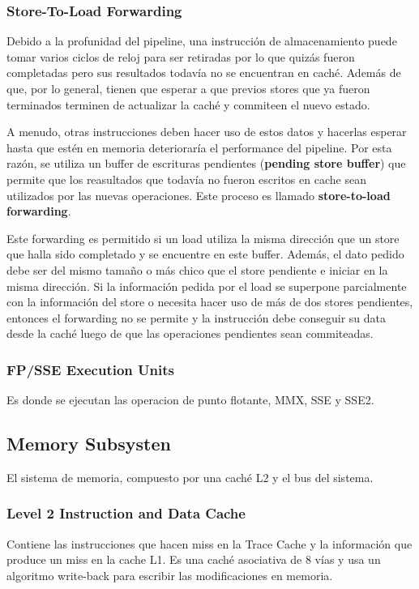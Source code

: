 \subsubsection*{Store-To-Load Forwarding}
Debido a la profunidad del pipeline, una instrucción de almacenamiento puede tomar varios ciclos de reloj para ser retiradas por lo que quizás fueron completadas pero sus resultados todavía no se encuentran en caché. Además de que, por lo general, tienen que esperar a que previos stores que ya fueron terminados terminen de actualizar la caché y commiteen el nuevo estado.
 
A menudo, otras instrucciones deben hacer uso de estos datos y hacerlas esperar hasta que estén en memoria deterioraría el performance del pipeline. Por esta razón, se utiliza un buffer de escrituras pendientes (\textbf{pending store buffer}) que permite que los reasultados que todavía no fueron escritos en cache sean utilizados por las nuevas operaciones. Este proceso es llamado \textbf{store-to-load forwarding}.

Este forwarding es permitido si un load utiliza la misma dirección que un store que halla sido completado y se encuentre en este buffer. Además, el dato pedido debe ser del mismo tamaño o más chico que el store pendiente e iniciar en la misma dirección. Si la información pedida por el load se superpone parcialmente con la información del store o necesita hacer uso de más de dos stores pendientes, entonces el forwarding no se permite y  la instrucción debe conseguir su data desde la caché luego de que las operaciones pendientes sean commiteadas.

\subsubsection*{FP/SSE Execution Units}
Es donde se ejecutan las operacion de punto flotante, MMX, SSE y SSE2.
\subsection{Memory Subsysten}
El sistema de memoria, compuesto por una caché L2 y el bus del sistema.

\subsubsection*{Level 2 Instruction and Data Cache}
Contiene las instrucciones que hacen miss en la Trace Cache y la información que produce un miss en la cache L1. Es una caché asociativa de 8 vías y usa un algoritmo write-back para escribir las modificaciones en memoria.

